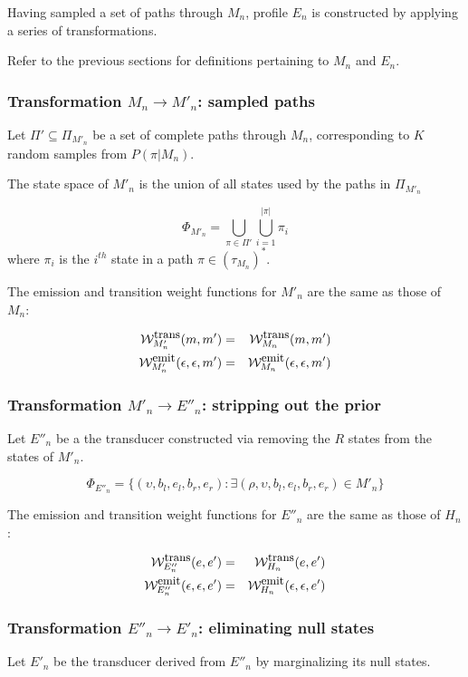 \documentclass{article}
\newcommand\States{\Phi}
\newcommand\statesof[1]{\States_{#1}}
\newcommand\Transitions{\tau}
\newcommand\transitionsof[1]{\Transitions_{#1}}
\newcommand\weight{{\cal W}}
\newcommand\weightfunof[1]{\weight_{#1}}
\newcommand\transweightfun[1]{\weightfunof{#1}^{\mbox{\small trans}}}
\newcommand\emitweightfun[1]{\weightfunof{#1}^{\mbox{\small emit}}}
\newcommand\hstate{(\upsilon,b_l,e_l,b_r,e_r)}
\newcommand\mstate{(\rho,\upsilon,b_l,e_l,b_r,e_r)}
\begin{document}
Having sampled a set of paths through $M_n$, profile $E_n$ is constructed by applying a series of transformations.

Refer to the previous sections for definitions pertaining to $M_n$ and $E_n$.

\subsubsection{Transformation $M_n \to M'_n$: sampled paths}

Let $\Pi' \subseteq \Pi_{M'_n}$ be a set of complete paths through $M_n$,
corresponding to $K$ random samples from $P(\pi|M_n)$.

The state space of $M'_n$ is the union of all states used by the paths in  $\Pi_{M'_n}$

\[ 
\statesof{M'_n} = \bigcup_{\pi \in \Pi'} \bigcup_{i=1}^{|\pi|} \pi_i  
\]
where $\pi_i$ is the $i^{th}$ state in a path $\pi \in (\transitionsof{M_n})^\ast$.

The emission and transition weight functions for $M'_n$ are the same as those of $M_n$:

\begin{eqnarray*}
\transweightfun{M'_n}(m,m') & = & \transweightfun{M_n}(m,m') \\
\emitweightfun{M'_n}(\epsilon,\epsilon,m') & = & \emitweightfun{M_n}(\epsilon,\epsilon,m')
\end{eqnarray*}


\subsubsection{Transformation $M'_n \to E''_n$: stripping out the prior}

Let $E''_n$ be a the transducer constructed via removing the $R$ states from the states of $M'_n$.  

\[
\statesof{E''_n} = \{ \hstate : \exists \mstate \in M'_n \}
\]

The emission and transition weight functions for $E''_n$ are the same as those of $H_n$:

\begin{eqnarray*}
\transweightfun{E''_n}(e,e') & = & \transweightfun{H_n}(e,e') \\
\emitweightfun{E''_n}(\epsilon,\epsilon,e') & = & \emitweightfun{H_n}(\epsilon,\epsilon,e')
\end{eqnarray*}


\subsubsection{Transformation $E''_n \to E'_n$: eliminating null states}
Let $E'_n$ be the transducer derived from $E''_n$ by marginalizing its null states.  
\end{document}
